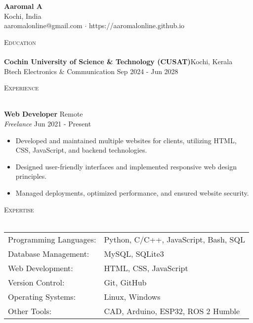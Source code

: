 \documentclass[a4paper]{article}
\newcommand{\lineunder} {
    \vspace*{-8pt} \\
    \hspace*{-18pt} \hrulefill \\
}
\newcommand{\header} [1] {
    {\hspace*{-18pt}\vspace*{6pt} \textsc{#1}}
    \vspace*{-6pt} \lineunder
}
\newcommand{\contact} [3] {
    \vspace*{20pt} %
    \begin{center}
        {\Huge \textbf{#1}}\\
        \vspace{5pt} %
        #2 \\ #3
    \end{center}
    \vspace*{-8pt}
}
\begin{document}
\vspace*{-40pt}

\vspace*{-10pt}
\contact{Aaromal A}{Kochi, India}{aaromalonline@gmail.com $\cdot$ https://aaromalonline.github.io}

\header{Education}
\textbf{Cochin University of Science & Technology (CUSAT)}\hfill Kochi, Kerala\\
Btech Electronics \& Communication \hfill Sep 2024 - Jun 2028\\
\vspace{2mm}

\header{Experience}
\vspace{1mm}

\textbf{Web Developer} \hfill Remote\\
\textit{Freelance} \hfill Jun 2021 - Present\\
\vspace{-1mm}
\begin{itemize} \itemsep 1pt
    \item Developed and maintained multiple websites for clients, utilizing HTML, CSS, JavaScript, and backend technologies.
    \item Designed user-friendly interfaces and implemented responsive web design principles.
    \item Managed deployments, optimized performance, and ensured website security.
\end{itemize}

\header{Expertise}
\begin{tabular}{ l l }
    Programming Languages: & Python, C/C++, JavaScript, Bash, SQL\\
    Database Management: & MySQL, SQLite3\\
    Web Development: & HTML, CSS, JavaScript\\
    Version Control: & Git, GitHub\\
    Operating Systems: & Linux, Windows\\
    Other Tools: & CAD, Arduino, ESP32, ROS 2 Humble\\
\end{tabular}
\vspace{2mm}
\end{document}
